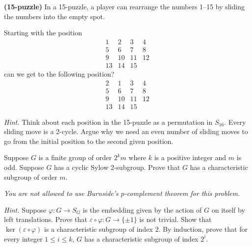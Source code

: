 \documentclass[12pt]{article}
\begin{document}
\begin{homeworkProblem}
  \textbf{(15-puzzle)}  
  In a 15-puzzle, a player can rearrange the numbers 1–15 by sliding the numbers into the empty spot.  

  Starting with the position
  \[
  \begin{matrix}
  1 & 2 & 3 & 4\\
  5 & 6 & 7 & 8\\
  9 & 10 & 11 & 12\\
  13 & 14 & 15 & \, 
  \end{matrix}
  \]
  can we get to the following position?
  \[
  \begin{matrix}
  2 & 1 & 3 & 4\\
  5 & 6 & 7 & 8\\
  9 & 10 & 11 & 12\\
  13 & 14 & 15 & \,
  \end{matrix}
  \]

  \textit{Hint.} Think about each position in the 15-puzzle as a permutation in $S_{16}$.  
  Every sliding move is a 2-cycle. Argue why we need an even number of sliding moves to go from the initial position to the second given position.
\end{homeworkProblem}

\begin{homeworkProblem}
  Suppose $G$ is a finite group of order $2^k m$ where $k$ is a positive integer and $m$ is odd.  
  Suppose $G$ has a cyclic Sylow 2-subgroup. Prove that $G$ has a characteristic subgroup of order $m$.  

  \textit{You are not allowed to use Burnside’s $p$-complement theorem for this problem.}

  \textit{Hint.} Suppose $\varphi : G \to S_G$ is the embedding given by the action of $G$ on itself by left translations.  
  Prove that $\varepsilon \circ \varphi : G \to \{\pm 1\}$ is not trivial.  
  Show that $\ker(\varepsilon \circ \varphi)$ is a characteristic subgroup of index $2$.  
  By induction, prove that for every integer $1 \le i \le k$, $G$ has a characteristic subgroup of index $2^i$.
\end{homeworkProblem}
\end{document}
